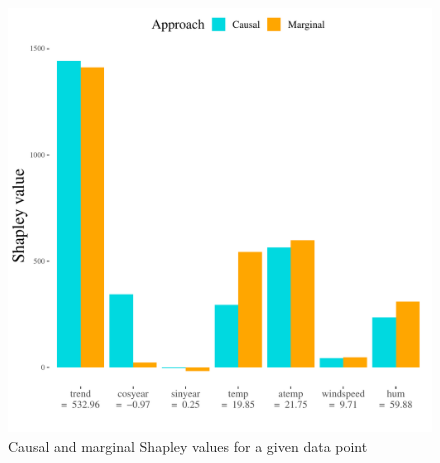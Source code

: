 \documentclass{article}
\begin{document}
\begin{figure}[ht!]
\centering
\includegraphics[width=1\textwidth]{figures/bar_plot.pdf}
\caption{Causal and marginal Shapley values for a given data point}
\label{fig:barplot}
\end{figure}
\newpage





\end{document}
